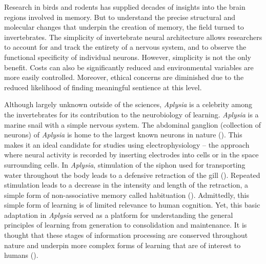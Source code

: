 \documentclass[
  jou,
  floatsintext,
  longtable,
  nolmodern,
  notxfonts,
  notimes,
  donotrepeattitle,
  colorlinks=true,linkcolor=blue,citecolor=blue,urlcolor=blue]{apa7}
\begin{document}
Research in birds and rodents has supplied decades of insights into the
brain regions involved in memory. But to understand the precise
structural and molecular changes that underpin the creation of memory,
the field turned to invertebrates. The simplicity of invertebrate neural
architecture allows researchers to account for and track the entirety of
a nervous system, and to observe the functional specificity of
individual neurons. However, simplicity is not the only benefit. Costs
can also be significantly reduced and environmental variables are more
easily controlled. Moreover, ethical concerns are diminished due to the
reduced likelihood of finding meaningful sentience at this level.

Although largely unknown outside of the sciences, \emph{Aplysia} is a
celebrity among the invertebrates for its contribution to the
neurobiology of learning. \emph{Aplysia} is a marine snail with a simple
nervous system. The abdominal ganglion (collection of neurons) of
\emph{Aplysia} is home to the largest known neurons in nature
(). This makes it an ideal
candidate for studies using electrophysiology -- the approach where
neural activity is recorded by inserting electrodes into cells or in the
space surrounding cells. In \emph{Aplysia}, stimulation of the siphon
used for transporting water throughout the body leads to a defensive
retraction of the gill (). Repeated stimulation leads to a decrease in the intensity
and length of the retraction, a simple form of non-associative memory
called habituation (). Admittedly, this simple form of learning is of limited
relevance to human cognition. Yet, this basic adaptation in
\emph{Aplysia} served as a platform for understanding the general
principles of learning from generation to consolidation and maintenance.
It is thought that these stages of information processing are conserved
throughout nature and underpin more complex forms of learning that are
of interest to humans ().
\end{document}
